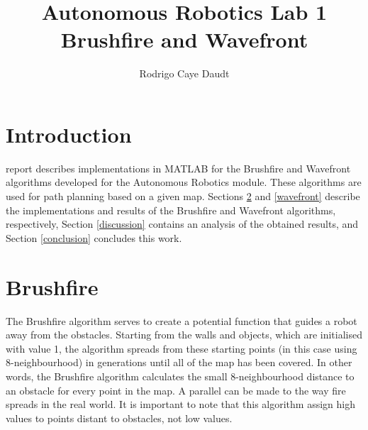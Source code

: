 \documentclass[journal]{IEEEtran}
\begin{document}
\title{Autonomous Robotics Lab 1 \\ Brushfire and Wavefront}
%
%
\author{Rodrigo Caye Daudt}





\maketitle







\section{Introduction}

 report describes implementations in MATLAB for the Brushfire and Wavefront algorithms developed for the Autonomous Robotics module. These algorithms are used for path planning based on a given map. Sections \ref{brushfire} and \ref{wavefront} describe the implementations and results of the Brushfire and Wavefront algorithms, respectively, Section \ref{discussion} contains an analysis of the obtained results, and Section \ref{conclusion} concludes this work.

\section{Brushfire}\label{brushfire}

The Brushfire algorithm serves to create a potential function that guides a robot away from the obstacles. Starting from the walls and objects, which are initialised with value 1, the algorithm spreads from these starting points (in this case using 8-neighbourhood) in generations until all of the map has been covered. In other words, the Brushfire algorithm calculates the small 8-neighbourhood distance to an obstacle for every point in the map. A parallel can be made to the way fire spreads in the real world. It is important to note that this algorithm assign high values to points distant to obstacles, not low values.
\end{document}
